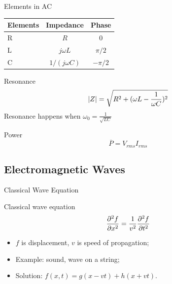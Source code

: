 \documentclass{beamer}
\begin{document}
\begin{frame}{Elements in AC}
    \begin{table}[htbp]
        \centering
        \begin{tabular}{l c c}
            \toprule
            Elements & Impedance        & Phase    \\
            \midrule
            R        & $R$              & 0        \\
            L        & $j\omega L $     & $\pi/2$  \\
            C        & $1/(j \omega C)$ & $-\pi/2$ \\
            \bottomrule
        \end{tabular}
    \end{table}

    \begin{block}{Resonance}
        \begin{equation}
            \abs{Z} = \sqrt{R^2+(\omega L - \frac{1}{\omega C})^2 }
        \end{equation}
        Resonance happens when $\omega_0 = \frac{1}{\sqrt{LC}}$
    \end{block}

    \begin{block}{Power}
        \begin{equation}
            \overline{P} = V_{rms} I_{rms}
        \end{equation}
    \end{block}
\end{frame}

\subsection{Electromagnetic Waves}

\begin{frame}{Classical Wave Equation}
    \begin{block}{Classical wave equation}
        \begin{equation}
            \pdv[2]{f}{x} = \frac{1}{v^2} \pdv[2]{f}{t}
        \end{equation}
    \end{block}
    \vfill
    \begin{itemize}
        \item $f$ is displacement, $v$ is speed of propagation;
        \item Example: sound, wave on a string;
        \item Solution: $f(x, t) = g(x - vt) + h(x + vt)$.
    \end{itemize}
\end{frame}
\end{document}
